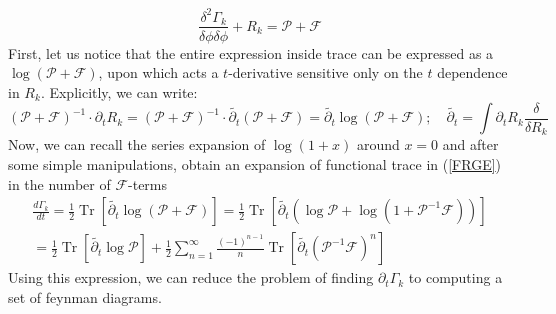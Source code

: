 \documentclass[11pt, a4paper]{article}
\begin{document}
\begin{equation}
    \frac{\delta^2 \Gamma_k}{\delta \phi \delta \phi} + R_k = \mathcal{P} + \mathcal{F}
    \label{pf1}
\end{equation}
First, let us notice that the entire expression inside trace can be expressed as a $\log{(\mathcal{P}+\mathcal{F})}$, upon which acts
a $t$-derivative sensitive only on the $t$ dependence in $R_k$. Explicitly, we can write:
\begin{equation}
    \left(\mathcal{P} + \mathcal{F}\right)^{-1} \cdot \partial_t R_k = \left(\mathcal{P} + \mathcal{F}\right)^{-1} \cdot \widetilde{\partial_t} \left(\mathcal{P}+\mathcal{F}\right) = \widetilde{\partial_t} \log{\left(\mathcal{P}+\mathcal{F}\right)}; \quad \widetilde{\partial_t} = \int \partial_t R_k \frac{\delta}{\delta R_k}
\end{equation}
Now, we can recall the series expansion of $\log{(1+x)}$ around $x=0$ and after some simple manipulations, obtain an expansion of functional trace in (\ref{FRGE}) in
the number of $\mathcal{F}$-terms
\begin{gather}
    \frac{d \Gamma_k}{dt} = \frac{1}{2} \operatorname{Tr} \left[ \widetilde{\partial_t} \log{\left(\mathcal{P}+\mathcal{F}\right)} \right] = \frac{1}{2} \operatorname{Tr} \left[ \widetilde{\partial_t} \left(\log{\mathcal{P}} + \log{(1+\mathcal{P}^{-1}\mathcal{F})}\right) \right] \\ =  \frac{1}{2} \operatorname{Tr} \left[ \widetilde{\partial_t} \log{\mathcal{P}} \right] + \frac{1}{2} \sum_{n=1}^{\infty} \frac{(-1)^{n-1}}{n} \operatorname{Tr}\left[\widetilde{\partial_t}\left(\mathcal{P}^{-1}\mathcal{F}\right)^n\right]
    \label{pf}
\end{gather}
Using this expression, we can reduce the problem of finding $\partial_t \Gamma_k$ to computing a set of feynman diagrams.



\end{document}

